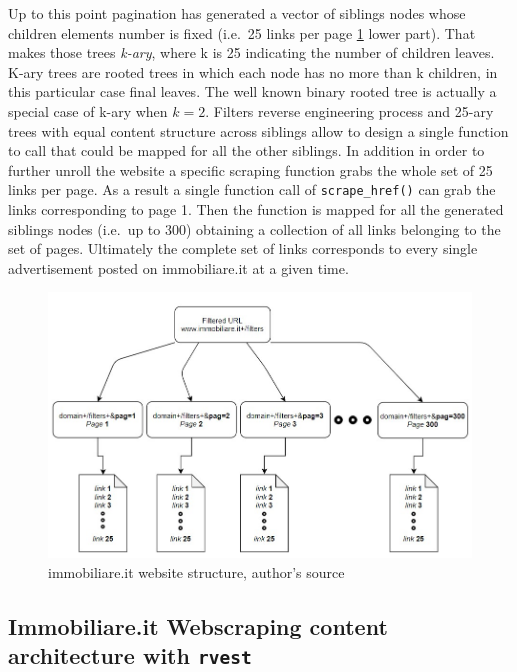 \documentclass[
  12pt,
  a4paper,
  oneside]{book}
\theoremstyle{definition}
\theoremstyle{definition}
\theoremstyle{definition}
\theoremstyle{remark}
\begin{document}
Up to this point pagination has generated a vector of siblings nodes whose children elements number is fixed (i.e.~25 links per page \ref{fig:websitetree} lower part). That makes those trees \emph{k-ary}, where k is 25 indicating the number of children leaves. K-ary trees are rooted trees in which each node has no more than k children, in this particular case final leaves. The well known binary rooted tree is actually a special case of k-ary when \(k = 2\). Filters reverse engineering process and 25-ary trees with equal content structure across siblings allow to design a single function to call that could be mapped for all the other siblings. In addition in order to further unroll the website a specific scraping function grabs the whole set of 25 links per page. As a result a single function call of \texttt{scrape\_href()} can grab the links corresponding to page 1. Then the function is mapped for all the generated siblings nodes (i.e.~up to 300) obtaining a collection of all links belonging to the set of pages. Ultimately the complete set of links corresponds to every single advertisement posted on immobiliare.it at a given time.

\begin{figure}
\centering
\includegraphics{images/website_tree1.jpg}
\caption{\label{fig:websitetree}immobiliare.it website structure, author's source}
\end{figure}

\hypertarget{immobiliare.it-webscraping-content-architecture-with-rvest}{%
\subsection{\texorpdfstring{Immobiliare.it Webscraping content architecture with \texttt{rvest}}{Immobiliare.it Webscraping content architecture with rvest}}\label{immobiliare.it-webscraping-content-architecture-with-rvest}}
\end{document}
